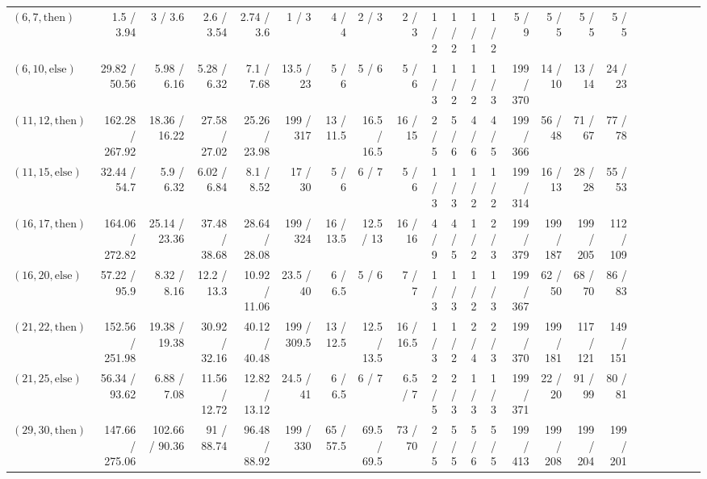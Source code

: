 \documentclass[sigconf]{acmart}
\newcommand{\thenBr}{\text{then}}
\newcommand{\elseBr}{\text{else}}
\begin{document}
\begin{table*}
{\begin{tabular}{l|rrrr|rrrr|rrrr|rrrr|r|r|r|r|r|r}
    $(6,7,\thenBr)$   & 1.5    / 3.94     & 3      / 3.6    & 2.6    / 3.54   & 2.74   / 3.6    & 1       / 3     & 4    / 4    & 2     / 3     & 2     / 3     & 1  / 2   & 1  / 2  & 1  / 1  & 1  / 2  & 5    / 9    & 5    / 5    & 5    / 5    & 5    / 5    & & & & & & \\
    $(6,10,\elseBr)$  & 29.82  / 50.56    & 5.98   / 6.16   & 5.28   / 6.32   & 7.1    / 7.68   & 13.5    / 23    & 5    / 6    & 5     / 6     & 5     / 6     & 1  / 3   & 1  / 2  & 1  / 2  & 1  / 3  & 199  / 370  & 14   / 10   & 13   / 14   & 24   / 23   & & & & & & \\
    $(11,12,\thenBr)$ & 162.28 / 267.92   & 18.36  / 16.22  & 27.58  / 27.02  & 25.26  / 23.98  & 199     / 317   & 13   / 11.5 & 16.5  / 16.5  & 16    / 15    & 2  / 5   & 5  / 6  & 4  / 6  & 4  / 5  & 199  / 366  & 56   / 48   & 71   / 67   & 77   / 78   & & & & & & \\
    $(11,15,\elseBr)$ & 32.44  / 54.7     & 5.9    / 6.32   & 6.02   / 6.84   & 8.1    / 8.52   & 17      / 30    & 5    / 6    & 6     / 7     & 5     / 6     & 1  / 3   & 1  / 3  & 1  / 2  & 1  / 2  & 199  / 314  & 16   / 13   & 28   / 28   & 55   / 53   & & & & & & \\
    $(16,17,\thenBr)$ & 164.06 / 272.82   & 25.14  / 23.36  & 37.48  / 38.68  & 28.64  / 28.08  & 199     / 324   & 16   / 13.5 & 12.5  / 13    & 16    / 16    & 4  / 9   & 4  / 5  & 1  / 2  & 2  / 3  & 199  / 379  & 199  / 187  & 199  / 205  & 112  / 109  & & & & & & \\
    $(16,20,\elseBr)$ & 57.22  / 95.9     & 8.32   / 8.16   & 12.2   / 13.3   & 10.92  / 11.06  & 23.5    / 40    & 6    / 6.5  & 5     / 6     & 7     / 7     & 1  / 3   & 1  / 3  & 1  / 2  & 1  / 3  & 199  / 367  & 62   / 50   & 68   / 70   & 86   / 83   & & & & & & \\
    $(21,22,\thenBr)$ & 152.56 / 251.98   & 19.38  / 19.38  & 30.92  / 32.16  & 40.12  / 40.48  & 199     / 309.5 & 13   / 12.5 & 12.5  / 13.5  & 16    / 16.5  & 1  / 3   & 1  / 2  & 2  / 4  & 2  / 3  & 199  / 370  & 199  / 181  & 117  / 121  & 149  / 151  & & & & & & \\
    $(21,25,\elseBr)$ & 56.34  / 93.62    & 6.88   / 7.08   & 11.56  / 12.72  & 12.82  / 13.12  & 24.5    / 41    & 6    / 6.5  & 6     / 7     & 6.5   / 7     & 2  / 5   & 2  / 3  & 1  / 3  & 1  / 3  & 199  / 371  & 22   / 20   & 91   / 99   & 80   / 81   & & & & & & \\
    $(29,30,\thenBr)$ & 147.66 / 275.06   & 102.66 / 90.36  & 91     / 88.74  & 96.48  / 88.92  & 199     / 330   & 65   / 57.5 & 69.5  / 69.5  & 73    / 70    & 2  / 5   & 5  / 5  & 5  / 6  & 5  / 5  & 199  / 413  & 199  / 208  & 199  / 204  & 199  / 201  & & & & & & \\

\end{tabular}}
\end{table*}
\end{document}
